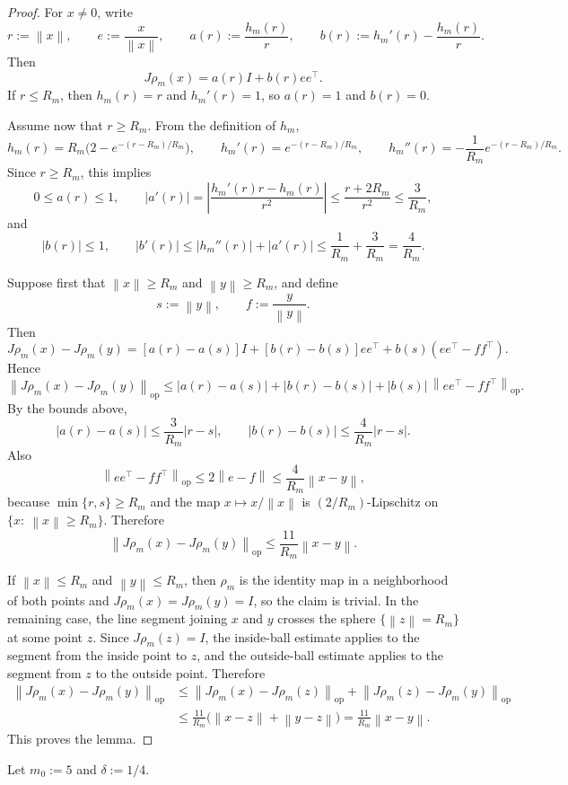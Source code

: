 \documentclass[11pt]{article}
\newcommand{\norm}[1]{\left\lVert #1\right\rVert}
\begin{document}
\begin{proof}
For $x\neq 0$, write
\[
r:=\norm{x},
\qquad
e:=\frac{x}{\norm{x}},
\qquad
a(r):=\frac{h_m(r)}{r},
\qquad
b(r):=h_m'(r)-\frac{h_m(r)}{r}.
\]
Then
\[
J\rho_m(x)=a(r)I+b(r)ee^\top.
\]
If $r\le R_m$, then $h_m(r)=r$ and $h_m'(r)=1$, so $a(r)=1$ and $b(r)=0$.

Assume now that $r\ge R_m$.
From the definition of $h_m$,
\[
h_m(r)=R_m\bigl(2-e^{-(r-R_m)/R_m}\bigr),
\qquad
h_m'(r)=e^{-(r-R_m)/R_m},
\qquad
h_m''(r)=-\frac{1}{R_m}e^{-(r-R_m)/R_m}.
\]
Since $r\ge R_m$, this implies
\[
0\le a(r)\le 1,
\qquad
|a'(r)|
=
\left|\frac{h_m'(r)r-h_m(r)}{r^2}\right|
\le
\frac{r+2R_m}{r^2}
\le
\frac{3}{R_m},
\]
and
\[
|b(r)|\le 1,
\qquad
|b'(r)|\le |h_m''(r)|+|a'(r)|\le \frac{1}{R_m}+\frac{3}{R_m}=\frac{4}{R_m}.
\]

Suppose first that $\norm{x}\ge R_m$ and $\norm{y}\ge R_m$, and define
\[
s:=\norm{y},
\qquad
f:=\frac{y}{\norm{y}}.
\]
Then
\[
J\rho_m(x)-J\rho_m(y)
=
[a(r)-a(s)]I+[b(r)-b(s)]ee^\top+b(s)(ee^\top-ff^\top).
\]
Hence
\[
\norm{J\rho_m(x)-J\rho_m(y)}_{\mathrm{op}}
\le
|a(r)-a(s)|+|b(r)-b(s)|+|b(s)|\,\norm{ee^\top-ff^\top}_{\mathrm{op}}.
\]
By the bounds above,
\[
|a(r)-a(s)|\le \frac{3}{R_m}|r-s|,
\qquad
|b(r)-b(s)|\le \frac{4}{R_m}|r-s|.
\]
Also
\[
\norm{ee^\top-ff^\top}_{\mathrm{op}}
\le
2\norm{e-f}
\le
\frac{4}{R_m}\norm{x-y},
\]
because $\min\{r,s\}\ge R_m$ and the map $x\mapsto x/\norm{x}$ is $(2/R_m)$-Lipschitz on $\{x:\ \norm{x}\ge R_m\}$.
Therefore
\[
\norm{J\rho_m(x)-J\rho_m(y)}_{\mathrm{op}}\le \frac{11}{R_m}\norm{x-y}.
\]

If $\norm{x}\le R_m$ and $\norm{y}\le R_m$, then \(\rho_m\) is the identity map in a neighborhood of both points and
$J\rho_m(x)=J\rho_m(y)=I$, so the claim is trivial.
In the remaining case, the line segment joining $x$ and $y$ crosses the sphere $\{\norm{z}=R_m\}$ at some point $z$.
Since $J\rho_m(z)=I$, the inside-ball estimate applies to the segment from the inside point to \(z\), and the
outside-ball estimate applies to the segment from \(z\) to the outside point. Therefore
\[
\begin{aligned}
\norm{J\rho_m(x)-J\rho_m(y)}_{\mathrm{op}}
&\le
\norm{J\rho_m(x)-J\rho_m(z)}_{\mathrm{op}}+\norm{J\rho_m(z)-J\rho_m(y)}_{\mathrm{op}}\\
&\le
\frac{11}{R_m}\bigl(\norm{x-z}+\norm{y-z}\bigr)
=
\frac{11}{R_m}\norm{x-y}.
\end{aligned}
\]
This proves the lemma.
\end{proof}

Let $m_0:=5$ and $\delta:=1/4$.
\end{document}

